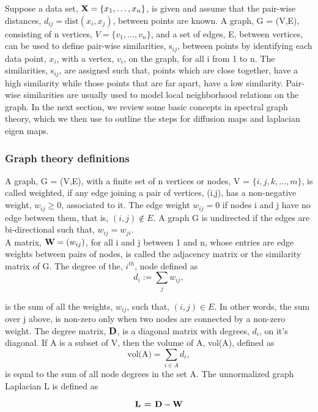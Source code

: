 Suppose a data set, $\textbf{X} =  \{x_{1}, \ldots, x_{n} \}$, is given  and assume that the pair-wise distances, $d_{ij} = \text{dist}(x_{i}, x_{j})$, between points are known. A graph, G = (V,E), consisting of n vertices, $V = \{v_{1}, \ldots, v_{n}\}$, and a set of edges, E, between vertices, can be used to define pair-wise  similarities, s$_{ij}$, between points by identifying each data point, $x_{i}$, with a vertex, $v_{i}$, on the graph, for all i from 1 to n.
The similarities, s$_{ij}$, are assigned such that, points which are close together, have a high similarity while those points that are far apart, have a low similarity. Pair-wise similarities are usually used to model
local neighborhood relations on the graph. In the next section, we review some basic concepts in spectral graph theory, which we then use to outline the steps for diffusion maps and laplacian eigen  maps.

\subsubsection{Graph theory definitions}

A graph, G = (V,E), with a finite set of n vertices or nodes, V = $\{i, j, k,...,m\}$, is called weighted, if any edge joining a pair of vertices, (i,j), has a non-negative weight, $w_{ij} \geq 0$, associated to it.
The edge weight $w_{ij}=0$ if nodes i and j have no edge between them, that is, $(i,j) \not \in E.$
A graph G is  undirected if the edges are bi-directional such that, $w_{ij} = w_{ji}$.\\
A matrix, $\textbf{W} = (w_{ij})$, for all i and j between 1 and n, 
whose entries are edge weights between pairs of nodes, is called the adjacency matrix or the similarity matrix of G. The degree of the, $i^{th}$, node defined 
as
\begin{equation}\label{degree}
d_{i} := \sum_{j}w_{ij}, 
\end{equation}

is the sum of all the weights, $w_{ij}$, such that, $(i,j) \in E.$ In other words, the sum over j above, is non-zero only when two nodes are connected
by a non-zero weight.
The degree matrix, $\textbf{D}$, is a diagonal matrix with degrees, $d_{i}$, on it's diagonal.
If A is a subset of V, then the volume of A, vol(A), defined as 
\[
\text{vol(A)} =  \displaystyle \sum_{i \in A} d_{i},
\]
is equal to the sum of all node degrees in the set A. The unnormalized graph Laplacian L is defined as

\begin{equation}\label{unnormalized Laplacian}
\textbf{L = D} - \textbf{W} 
\end{equation}


